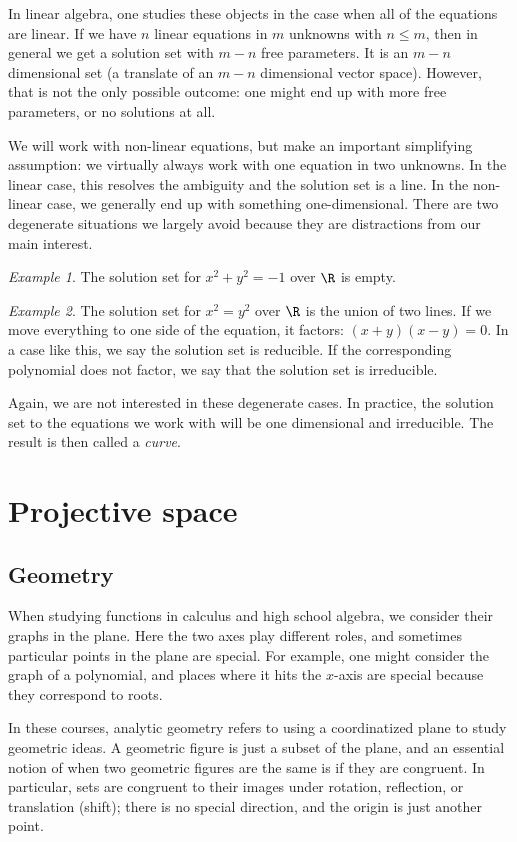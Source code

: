 \documentclass[12pt]{amsart}
\theoremstyle{plain}
\theoremstyle{definition}
\theoremstyle{remark}
\newtheorem*{exam}{Example}
\begin{document}
In linear algebra, one studies these objects in the case when all of
the equations are linear.  If we have $n$ linear equations in $m$
unknowns with $n\leq m$, then in general we get a solution set with
$m-n$ free parameters.  It is an $m-n$ dimensional set (a translate of
an $m-n$ dimensional vector space).  However, that is not the only
possible outcome: one might end up with more free parameters, or no
solutions at all.

We will work with non-linear equations, but make an important
simplifying assumption: we virtually always work with one equation in
two unknowns.  In the linear case, this resolves the ambiguity and the
solution set is a line.  In the non-linear case, we generally end up
with something one-dimensional.  There are two degenerate
situations we largely avoid because they are
distractions from our main interest.
\begin{exam}
  The solution set for $x^2+y^2=-1$ over $\R$ is empty.
\end{exam}
\begin{exam}
  The solution set for $x^2=y^2$ over $\R$ is the union of two lines.
  If we move everything to one side of the equation, it factors:
  $(x+y)(x-y)=0$.  In a case like this, we say the solution set is
  reducible.  If the corresponding polynomial does not factor, we say
  that the solution set is irreducible.
\end{exam}
Again, we are not interested in these degenerate cases.  In practice, the
solution set to the equations we work with will be one dimensional and
irreducible.  The result is then called a \emph{curve}.



\section{Projective space}

\subsection{Geometry}
When studying functions in calculus and high school algebra, we
consider their graphs in the plane.  Here the two axes play different
roles, and sometimes particular points in the plane are special.  For
example, one might consider the graph of a polynomial, and places
where it hits the $x$-axis are special because they correspond to
roots.

In these courses, analytic geometry refers to using a coordinatized
plane to study geometric ideas.  A geometric figure is just a subset
of the plane, and an essential notion of when two geometric figures
are the same is if they are congruent.  In particular, sets are
congruent to their images under rotation, reflection, or translation
(shift); there is no special direction, and the origin is just another
point.
\end{document}
